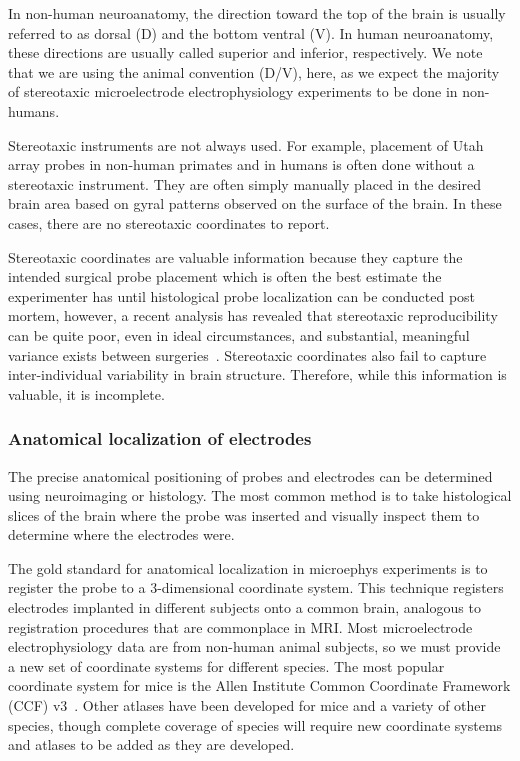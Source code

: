 \documentclass[fleqn,10pt]{article}
\begin{document}
In non-human neuroanatomy, the direction toward the top of the brain is usually referred to as dorsal (D) and the bottom ventral (V).
In human neuroanatomy, these directions are usually called superior and inferior, respectively.
We note that we are using the animal convention (D/V), here, as we expect the majority of stereotaxic microelectrode electrophysiology experiments to be done in non-humans.

Stereotaxic instruments are not always used.
For example, placement of Utah array probes in non-human primates and in humans is often done without a stereotaxic instrument.
They are often simply manually placed in the desired brain area based on gyral patterns observed on the surface of the brain.
In these cases, there are no stereotaxic coordinates to report.

Stereotaxic coordinates are valuable information because they capture the intended surgical probe placement which is often the best estimate the experimenter has until histological probe localization can be conducted post mortem, however, a recent analysis has revealed that stereotaxic reproducibility can be quite poor, even in ideal circumstances, and substantial, meaningful variance exists between surgeries~\citep{international_brain_laboratory_reproducibility_2025}.
Stereotaxic coordinates also fail to capture inter-individual variability in brain structure.
Therefore, while this information is valuable, it is incomplete.

\subsubsection*{Anatomical localization of electrodes}\label{sec:anatomical-localization}

The precise anatomical positioning of probes and electrodes can be determined using neuroimaging or histology.
The most common method is to take histological slices of the brain where the probe was inserted and visually inspect them to determine where the electrodes were.

The gold standard for anatomical localization in microephys experiments is to register the probe to a 3-dimensional coordinate system.
This technique registers electrodes implanted in different subjects onto a common brain, analogous to registration procedures that are commonplace in MRI.
Most microelectrode electrophysiology data are from non-human animal subjects, so we must provide a new set of coordinate systems for different species.
The most popular coordinate system for mice is the Allen Institute Common Coordinate Framework (CCF) v3~\citep{wang_allen_2020}.
Other atlases have been developed for mice and a variety of other species, though complete coverage of species will require new coordinate systems and atlases to be added as they are developed.
\end{document}
